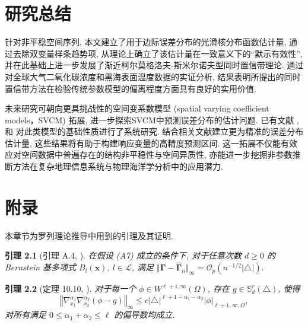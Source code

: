 \documentclass[a4paper,openay,14pt]{ctexbook}
\newtheorem{lem}{引理}
\numberwithin{equation}{section}
\numberwithin{lem}{section}
\newcommand{\chapterwithfancyheader}[1]{  
    \chapter{#1} %
    \thispagestyle{fancy} %
}
\begin{document}
\chapterwithfancyheader{研究总结}\label{SEC: Conclusion}
针对非平稳空间序列, 本文建立了用于边际误差分布的光滑核分布函数估计量, 通过去除双变量样条趋势项, 从理论上确立了该估计量在一致意义下的“默示有效性”, 并在此基础上进一步发展了渐近柯尔莫格洛夫-斯米尔诺夫型同时置信带理论. 通过对全球大气二氧化碳浓度和黑海表面温度数据的实证分析, 结果表明所提出的同时置信带方法在检验传统参数模型的偏离程度方面具有良好的实用价值.

未来研究可朝向更具挑战性的空间变系数模型 (spatial varying coefficient models，SVCM) 拓展, 进一步探索SVCM中预测误差分布的估计问题. 已有文献 \cite{mu2018estimation},\cite{wang2020efficient}和\cite{mu2020spatial} 对此类模型的基础性质进行了系统研究. 结合相关文献建立更为精准的误差分布估计量, 这些结果将有助于构建响应变量的高精度预测区间. 这一拓展不仅能有效应对空间数据中普遍存在的结构非平稳性与空间异质性, 亦能进一步挖掘非参数推断方法在复杂地理信息系统与物理海洋学分析中的应用潜力.


\backmatter
\newpage
{}  

\normalem 



\newpage
\pagestyle{fancy}
\chapterwithfancyheader{附录}\label{SEC: proof}
\setcounter{section}{0}
\setcounter{equation}{0}
\def\theequation{A.\arabic{equation}}
\def\thesection{A}
\renewcommand{\thelemma}{A.\arabic{lemma}} 

本章节为罗列理论推导中用到的引理及其证明. 



\begin{lem}[引理 A.4, \cite{yu2019estimation}]\label{Lemma:Gamma-Gammahat}
在假设 (A7) 成立的条件下, 对于任意次数 \( d \geq 0 \) 的 Bernstein 基多项式 \( B_l(\boldsymbol{x}) \),  \( l \in \mathcal{L} \), 满足
\(\Vert \bm{\Gamma} - \hat{\bm{\Gamma}}_{n} \Vert_{\infty} = \mathcal{O}_p\left(n^{-1/2} |\triangle|\right).\)
\end{lem}

\begin{lem}[定理 10.10, \cite{lai2007spline}]\label{Lemma:phi-g}
    对于每一个 $\phi\in W^{\ell+1,\infty}(\Omega)$, 存在 $g\in\mathbb{S}_d^r(\triangle)$, 使得 
    $$\left\Vert \nabla_{x_1}^{\alpha_1}\nabla_{x_2}^{\alpha_2}(\phi-g)\right\Vert_{\infty}\leq c\vert \triangle\vert^{\ell+1-\alpha_1-\alpha_2}\vert \phi\vert_{\ell+1,\infty,\Omega},$$
    对所有满足 $0\leq \alpha_1+\alpha_2\leq \ell$ 的偏导数均成立.
\end{lem}
\end{document}
